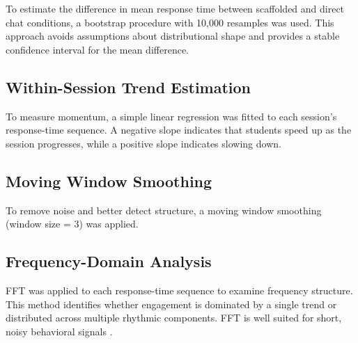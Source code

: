 \documentclass[10pt]{article}
\begin{document}
To estimate the difference in mean response time between scaffolded and direct chat conditions, a bootstrap procedure with 10,000 resamples was used. This approach avoids assumptions about distributional shape and provides a stable confidence interval for the mean difference. 

\subsection{Within-Session Trend Estimation}

To measure momentum, a simple linear regression was fitted to each session's response-time sequence. A negative slope indicates that students speed up as the session progresses, while a positive slope indicates slowing down.

\subsection {Moving Window Smoothing}

To remove noise and better detect structure, a moving window smoothing (window size = 3) was applied.





\subsection{Frequency-Domain Analysis}

FFT was applied to each response-time sequence to examine frequency structure. This method identifies whether engagement is dominated by a single trend or distributed across multiple rhythmic components. FFT is well suited for short, noisy behavioral signals \cite{twitter2023}.
\end{document}
